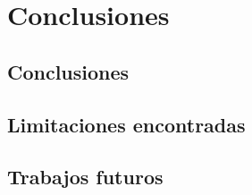 \chapter{\textbf{Conclusiones}}
\label{ch:concl}
\thispagestyle{fancy} 

\section{Conclusiones}
\label{sec:conclusiones_finales}

\textoBase

\section{Limitaciones encontradas}
\label{sec:limitaciones}

\textoBaseAlt

\section{Trabajos futuros}
\label{sec:trabajos_futuros}

\textoBase
